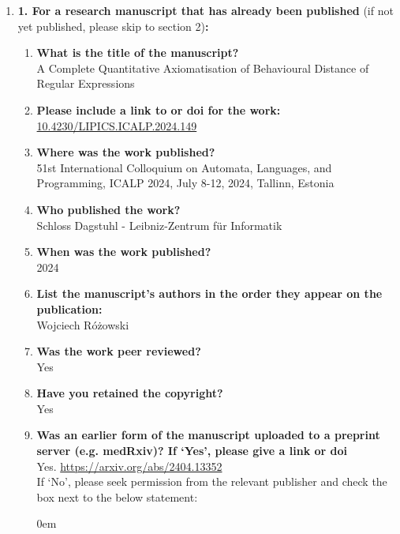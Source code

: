 	
	\begin{enumerate}\itemsep0em
%		
		\item \textbf{1.	For a research manuscript that has already been published} (if not yet published, please skip to section 2)\textbf{:}
%
		\begin{enumerate}\itemsep0em
%			
			\item \textbf{What is the title of the manuscript?}\\
			A Complete Quantitative Axiomatisation of Behavioural Distance of Regular Expressions
			\item \textbf{Please include a link to or doi for the work:}\\
			\url{10.4230/LIPICS.ICALP.2024.149}
			\item \textbf{Where was the work published?}\\
            51st International Colloquium on Automata, Languages, and Programming,
                  {ICALP} 2024, July 8-12, 2024, Tallinn, Estonia
			\item \textbf{Who published the work?}\\
			Schloss Dagstuhl - Leibniz-Zentrum f{\"{u}}r Informatik
			\item \textbf{When was the work published?}\\
			2024
			\item \textbf{List the manuscript's authors in the order they appear on the publication:}\\
			Wojciech R\'{o}\.{z}owski
			\item \textbf{Was the work peer reviewed?}\\
			Yes
			\item \textbf{Have you retained the copyright?}\\
			Yes 
			\item \textbf{Was an earlier form of the manuscript uploaded to a preprint server (e.g. medRxiv)? If ‘Yes’, please give a link or doi} \\
	    	Yes. \url{https://arxiv.org/abs/2404.13352}
			\\
			If ‘No’, please seek permission from the relevant publisher and check the box next to the below statement:
%			
			\begin{itemize}\itemsep0em

\end{itemize}
\end{enumerate}
\end{enumerate}
